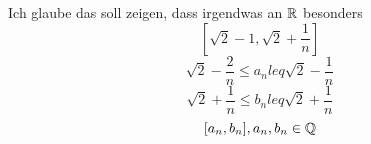 \documentclass[consecutivenumbering]{gadsescript}
\begin{document}
\begin{subexample*}
	Ich glaube das soll zeigen, dass irgendwas an $ \mathbb{R} $ besonders
	\[ [ \sqrt{2} - 1, \sqrt{2} + \frac{1}{n} ] \]
	\[ \sqrt{2} - \frac{2}{n} \leq a_n leq \sqrt{2} - \frac{1}{n} \]
	\[ \sqrt{2} + \frac{1}{n} \leq b_n leq \sqrt{2} + \frac{1}{n} \]
	\[ [ a_n, b_n ], a_n, b_n \in \mathbb{Q} \]
\end{subexample*}
\end{document}
